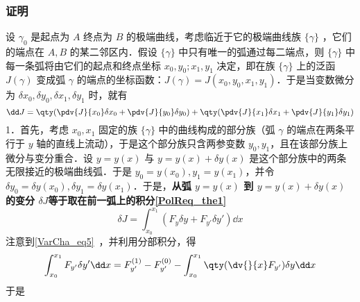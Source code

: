 \subsubsection{证明}
设 $\gamma_0$ 是起点为 $A$ 终点为 $B$ 的极端曲线，考虑临近于它的极端曲线族 $\{\gamma\}$ ，它们的端点在 $A,B$ 的某二邻区内．假设 $\{\gamma\}$ 中只有唯一的弧通过每二端点，则 $\{\gamma\}$ 中每一条弧将由它们的起点和终点坐标 $x_0,y_0;x_1,y_1$ 决定，即在族 $\{\gamma\}$ 上的泛函 $J(\gamma)$ 变成弧 $\gamma$ 的端点的坐标函数：$J(\gamma)=J(x_0,y_0,x_1,y_1)$．于是当变数微分为 $\delta x_0,\delta y_0,\delta x_1,\delta y_1$ 时，就有
\begin{equation}
\dd J=\qty(\pdv{J}{x_0}\delta x_0+\pdv{J}{y_0}\delta y_0)+\qty(\pdv{J}{x_1}\delta x_1+\pdv{J}{y_1}\delta y_1)
\end{equation}
1．首先，考虑 $x_0,x_1$ 固定的族 $\{\gamma\}$ 中的曲线构成的部分族（弧 $\gamma$ 的端点在两条平行于 $y$ 轴的直线上流动），于是这个部分族只含两参变数 $y_0,y_1$，且在该部分族上微分与变分重合．设 $y=y(x)$ 与 $y=y(x)+\delta y(x)$ 是这个部分族中的两条无限接近的极端曲线弧．于是 $y_0=y(x_0),y_1=y(x_1)$，并令 $\delta y_0=\delta y(x_0),\delta y_1=\delta y(x_1)$．于是，\textbf{从弧 $y=y(x)$ 到 $y=y(x)+\delta y(x)$ 的变分 $\delta J$等于取在前一弧上的积分\autoref{PolReq_the1}~}
\begin{equation}
\delta J=\int_{x_0}^{x_1}(F_{y}\delta y+F_{y'}\delta y')\dd x
\end{equation}
注意到\autoref{VarCha_eq5}~，并利用分部积分，得
\begin{equation}
\int_{x_0}^{x_1}F_{y'}\delta y' \dd x=F_{y'}^{(1)}-F_{y'}^{(0)}-\int_{x_0}^{x_1}\qty(\dv{}{x}F_{y'})\delta y\dd x
\end{equation}
于是